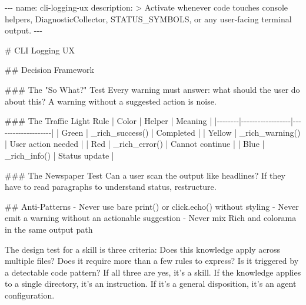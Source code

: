 \documentclass[
  a4paper,
  DIV=11,
  numbers=noendperiod]{scrreprt}
\newenvironment{Shaded}{\begin{snugshade}}{\end{snugshade}}
\newcommand{\AnnotationTok}[1]{\textcolor[rgb]{0.37,0.37,0.37}{#1}}
\newcommand{\CommentTok}[1]{\textcolor[rgb]{0.37,0.37,0.37}{#1}}
\newcommand{\FunctionTok}[1]{\textcolor[rgb]{0.28,0.35,0.67}{#1}}
\newcommand{\NormalTok}[1]{\textcolor[rgb]{0.00,0.23,0.31}{#1}}
\newcommand{\PreprocessorTok}[1]{\textcolor[rgb]{0.68,0.00,0.00}{#1}}
\newcommand{\SpecialStringTok}[1]{\textcolor[rgb]{0.13,0.47,0.30}{#1}}
\begin{document}
\begin{Shaded}
\begin{Highlighting}[]
\CommentTok{{-}{-}{-}}
\AnnotationTok{name:}\CommentTok{ cli{-}logging{-}ux}
\AnnotationTok{description:}\CommentTok{ \textgreater{}}
\CommentTok{  Activate whenever code touches console helpers, DiagnosticCollector,}
\CommentTok{  STATUS\_SYMBOLS, or any user{-}facing terminal output.}
\CommentTok{{-}{-}{-}}

\FunctionTok{\# CLI Logging UX}

\FunctionTok{\#\# Decision Framework}

\FunctionTok{\#\#\# The "So What?" Test}
\NormalTok{Every warning must answer: what should the user do about this?}
\NormalTok{A warning without a suggested action is noise.}

\FunctionTok{\#\#\# The Traffic Light Rule}
\PreprocessorTok{|}\NormalTok{ Color  }\PreprocessorTok{|}\NormalTok{ Helper           }\PreprocessorTok{|}\NormalTok{ Meaning            }\PreprocessorTok{|}
\PreprocessorTok{|{-}{-}{-}{-}{-}{-}{-}{-}|{-}{-}{-}{-}{-}{-}{-}{-}{-}{-}{-}{-}{-}{-}{-}{-}{-}{-}|{-}{-}{-}{-}{-}{-}{-}{-}{-}{-}{-}{-}{-}{-}{-}{-}{-}{-}{-}{-}|}
\PreprocessorTok{|}\NormalTok{ Green  }\PreprocessorTok{|}\NormalTok{ \_rich\_success()  }\PreprocessorTok{|}\NormalTok{ Completed          }\PreprocessorTok{|}
\PreprocessorTok{|}\NormalTok{ Yellow }\PreprocessorTok{|}\NormalTok{ \_rich\_warning()  }\PreprocessorTok{|}\NormalTok{ User action needed }\PreprocessorTok{|}
\PreprocessorTok{|}\NormalTok{ Red    }\PreprocessorTok{|}\NormalTok{ \_rich\_error()    }\PreprocessorTok{|}\NormalTok{ Cannot continue    }\PreprocessorTok{|}
\PreprocessorTok{|}\NormalTok{ Blue   }\PreprocessorTok{|}\NormalTok{ \_rich\_info()     }\PreprocessorTok{|}\NormalTok{ Status update      }\PreprocessorTok{|}

\FunctionTok{\#\#\# The Newspaper Test}
\NormalTok{Can a user scan the output like headlines?}
\NormalTok{If they have to read paragraphs to understand status, restructure.}

\FunctionTok{\#\# Anti{-}Patterns}
\SpecialStringTok{{-} }\NormalTok{Never use bare print() or click.echo() without styling}
\SpecialStringTok{{-} }\NormalTok{Never emit a warning without an actionable suggestion}
\SpecialStringTok{{-} }\NormalTok{Never mix Rich and colorama in the same output path}
\end{Highlighting}
\end{Shaded}

The design test for a skill is three criteria: Does this knowledge apply
across multiple files? Does it require more than a few rules to express?
Is it triggered by a detectable code pattern? If all three are yes, it's
a skill. If the knowledge applies to a single directory, it's an
instruction. If it's a general disposition, it's an agent configuration.
\end{document}
